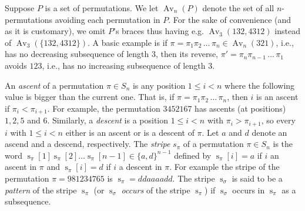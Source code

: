 \documentclass[a4paper]{llncs}
\DeclareMathOperator{\AV}{Av}
\DeclareMathOperator{\stripea}{s}
\newcommand{\stripe}[2]{\stripea_{{#1}}[{#2}]}
\newcommand{\stripew}[1]{\stripea_{{#1}}}
\newcommand{\dstep}{d}
\newcommand{\ustep}{a}
\begin{document}
Suppose $P$ is a set of permutations. We let $\AV_n(P)$ denote the
set of all $n$-permutations avoiding each permutation in $P$.
For the sake of convenience
(and as it is customary), we omit $P$'s braces thus having
e.g. $\AV_3(132,4312)$ instead of
$\AV_3(\{132,4312\})$.
A basic example is if
$\pi = \pi_1\pi_2\,\ldots\,\pi_n \in \AV_n(321)$, i.e.,
has no decreasing subsequence of length $3$, then its reverse,
$\pi' = \pi_n\pi_{n-1}\,\ldots\,\pi_1$ avoids $123$, i.e.,
has no increasing subsequence of length $3$.

An \emph{ascent} of a permutation $\pi \in S_n$ is any position
$1 \leq i < n$ where the following value is bigger than the current one.
That is, if $\pi = \pi_1\pi_2\,\ldots\,\pi_n$, then
$i$ is an ascent if $\pi_i < \pi_{i+1}$.
For example, the permutation
$345216$7 has ascents (at positions) $1,2,5$ and $6$.
Similarly, a \emph{descent} is a position
$1 \leq i < n$ with $\pi_i > \pi_{i+1}$,
so every $i$ with $1 \leq i < n$ either is an ascent or is a descent of
$\pi$.
Let $\ustep$ and $\dstep$ denote an ascend and a descend, respectively.
The \emph{stripe} $s_\pi$ of a permutation $\pi \in S_n$ is the word
$\stripe{\pi}{1} \stripe{\pi}{2} \ldots \stripe{\pi}{n-1} \in \{\ustep,\dstep\}^{n-1}$
defined by
$ \stripe{\pi}{i}= \ustep$ if $i$ an ascent in $\pi$ and
$\stripe{\pi}{i} = \dstep$ if $i$ a descent in $\pi$.
For example the stripe of the permutation
$\pi = 981234765$
is $\stripew{\pi} = \dstep\dstep\ustep\ustep\ustep\ustep\dstep\dstep$.
The stripe $\stripew{\sigma}$ is said to be a \emph{pattern} of the stripe $\stripew{\pi}$
(or $\stripew{\sigma}$ \emph{occurs} of the stripe $\stripew{\pi}$)
if $\stripew{\sigma}$ occurs in $\stripew{\pi}$ as a subsequence.
\end{document}
